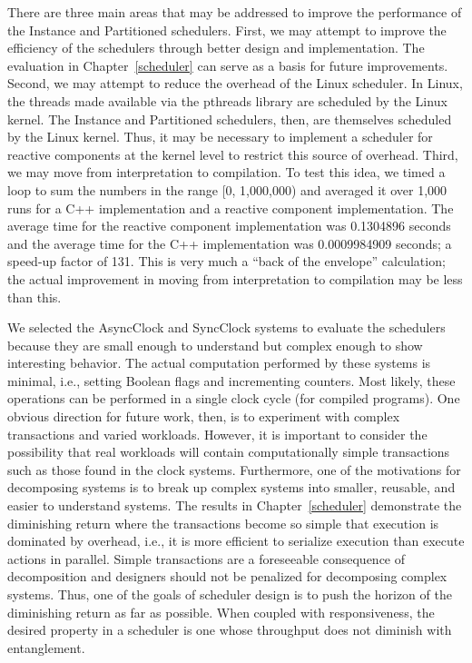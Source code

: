 There are three main areas that may be addressed to improve the performance of the Instance and Partitioned schedulers.
First, we may attempt to improve the efficiency of the schedulers through better design and implementation.
The evaluation in Chapter~\ref{scheduler} can serve as a basis for future improvements.
Second, we may attempt to reduce the overhead of the Linux scheduler.
In Linux, the threads made available via the pthreads library are scheduled by the Linux kernel.
The Instance and Partitioned schedulers, then, are themselves scheduled by the Linux kernel.
Thus, it may be necessary to implement a scheduler for reactive components at the kernel level to restrict this source of overhead.
Third, we may move from interpretation to compilation.
To test this idea, we timed a loop to sum the numbers in the range [0, 1,000,000) and averaged it over 1,000 runs for a C++ implementation and a reactive component implementation.
The average time for the reactive component implementation was 0.1304896 seconds and the average time for the C++ implementation was 0.0009984909 seconds; a speed-up factor of 131.
This is very much a ``back of the envelope'' calculation; the actual improvement in moving from interpretation to compilation may be less than this.

We selected the AsyncClock and SyncClock systems to evaluate the schedulers because they are small enough to understand but complex enough to show interesting behavior.
The actual computation performed by these systems is minimal, i.e., setting Boolean flags and incrementing counters.
Most likely, these operations can be performed in a single clock cycle (for compiled programs).
One obvious direction for future work, then, is to experiment with complex transactions and varied workloads.
However, it is important to consider the possibility that real workloads will contain computationally simple transactions such as those found in the clock systems.
Furthermore, one of the motivations for decomposing systems is to break up complex systems into smaller, reusable, and easier to understand systems.
The results in Chapter~\ref{scheduler} demonstrate the diminishing return where the transactions become so simple that execution is dominated by overhead, i.e., it is more efficient to serialize execution than execute actions in parallel.
Simple transactions are a foreseeable consequence of decomposition and designers should not be penalized for decomposing complex systems.
Thus, one of the goals of scheduler design is to push the horizon of the diminishing return as far as possible.
When coupled with responsiveness, the desired property in a scheduler is one whose throughput does not diminish with entanglement.

